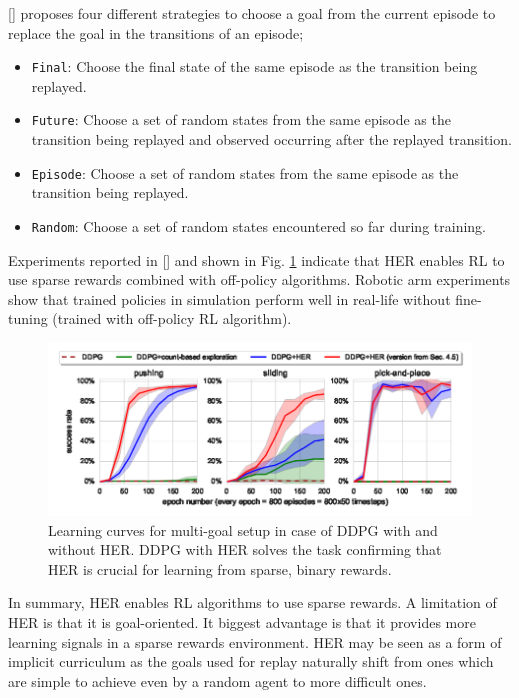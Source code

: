 \documentclass[conference]{IEEEtran}
\begin{document}
[\cite{andrychowicz2017hindsight}] proposes four different strategies to choose a goal from the current episode to replace the goal in the transitions of an episode;
\begin{itemize}
 \item \texttt{Final}: Choose the final state of the same episode as the transition being replayed.
 \item \texttt{Future}: Choose a set of random states from the same episode as the transition being replayed and observed occurring after the replayed transition.
 \item \texttt{Episode}: Choose a set of random states from the same episode as the transition being replayed.
 \item \texttt{Random}: Choose a set of random states encountered so far during training.
\end{itemize}

Experiments reported in [\cite{andrychowicz2017hindsight}] and shown in Fig. \ref{fig:her_robot_experiment} indicate that HER enables RL to use sparse rewards combined with off-policy algorithms. Robotic arm experiments show that trained policies in simulation perform well in real-life without fine-tuning (trained with off-policy RL algorithm).
\begin{figure}[ht]
\centering
\includegraphics[width=0.9\columnwidth]{img/HER_robotic_experiments.png}
\caption{Learning curves for multi-goal setup in case of DDPG with and without HER. DDPG with HER solves the task confirming that HER is crucial for learning from sparse, binary rewards.}
\label{fig:her_robot_experiment}
\end{figure}

In summary, HER enables RL algorithms to use sparse rewards. A limitation of HER is that it is goal-oriented. It biggest advantage is that it provides more learning signals in a sparse rewards environment. HER may be seen as a form of implicit curriculum as the goals used for replay naturally shift from ones which are simple to achieve even by a random agent to more difficult ones.
\end{document}
